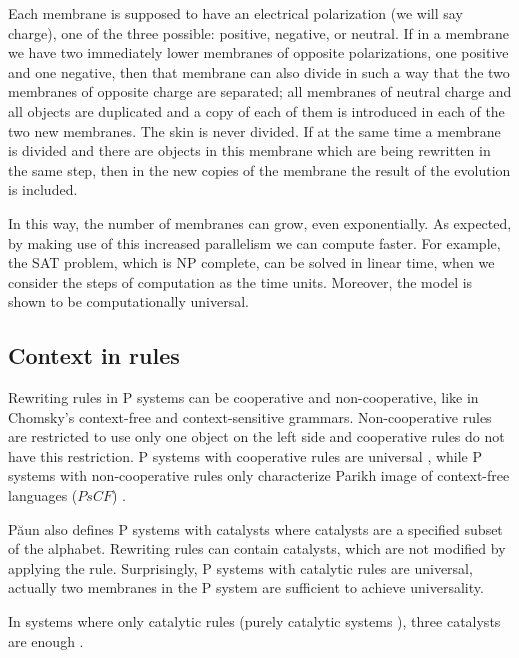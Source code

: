 
Each membrane is supposed to have an electrical polarization (we will say charge), one of the three possible: positive, negative, or neutral. If in a membrane we have two immediately lower membranes of opposite polarizations, one positive and one negative, then that membrane can also divide in such a way that the two membranes of opposite charge are separated; all membranes of neutral charge and all objects are duplicated and a copy of each of them is introduced in each of the two new membranes.
The skin is never divided.
If at the same time a membrane is divided and there are objects in this membrane which are being rewritten in the same step, then in the new copies of the membrane the result of the evolution is included.

In this way, the number of membranes can grow, even exponentially. As expected, by making use of this increased parallelism we can compute faster.
For example, the SAT problem, which is NP complete, can be solved in linear time, when we consider the steps of computation as the time units.
Moreover, the model is shown to be computationally universal.


\subsection{Context in rules} %
\label{sub:context_in_rules}


Rewriting rules in P systems can be cooperative and non-cooperative, like in Chomsky's context-free and context-sensitive grammars. Non-cooperative rules are restricted to use only one object on the left side and cooperative rules do not have this restriction.
P systems with cooperative rules are universal \cite{Paun98}, while P systems with non-cooperative rules only characterize Parikh image of context-free languages ($PsCF$) \cite{Sburlan05dragos}.


P\u{a}un \cite{Paun98} also defines P systems with catalysts where catalysts are a specified subset of the alphabet. Rewriting rules can contain catalysts, which are not modified by applying the rule. Surprisingly, P systems with catalytic rules are universal, actually two membranes in the P system are sufficient to achieve universality.

In systems where only catalytic rules (purely catalytic systems \cite{Ibarra:03:Catalytic}), three catalysts are enough \cite{Freund2005TwoCatalysts}.

